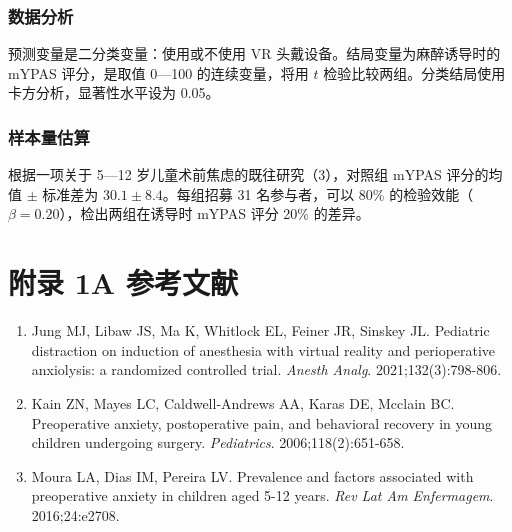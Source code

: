 \subsubsection{数据分析}
预测变量是二分类变量：使用或不使用 VR 头戴设备。结局变量为麻醉诱导时的 mYPAS 评分，是取值 0—100 的连续变量，将用 $t$ 检验比较两组。分类结局使用卡方分析，显著性水平设为 0.05。

\subsubsection{样本量估算}
根据一项关于 5—12 岁儿童术前焦虑的既往研究（3），对照组 mYPAS 评分的均值 $\pm$ 标准差为 $30.1\pm8.4$。每组招募 31 名参与者，可以 80\% 的检验效能（$\beta=0.20$），检出两组在诱导时 mYPAS 评分 20\% 的差异。

\section*{附录 1A 参考文献}
\begingroup\small\begin{enumerate}[leftmargin=2em,itemsep=3pt]
\item Jung MJ, Libaw JS, Ma K, Whitlock EL, Feiner JR, Sinskey JL. Pediatric distraction on induction of anesthesia with virtual reality and perioperative anxiolysis: a randomized controlled trial. \textit{Anesth Analg}. 2021;132(3):798-806.
\item Kain ZN, Mayes LC, Caldwell-Andrews AA, Karas DE, Mcclain BC. Preoperative anxiety, postoperative pain, and behavioral recovery in young children undergoing surgery. \textit{Pediatrics}. 2006;118(2):651-658.
\item Moura LA, Dias IM, Pereira LV. Prevalence and factors associated with preoperative anxiety in children aged 5-12 years. \textit{Rev Lat Am Enfermagem}. 2016;24:e2708.
\end{enumerate}\endgroup

